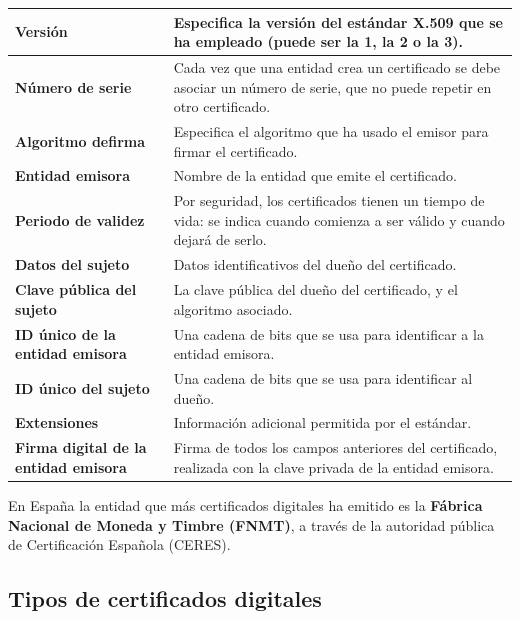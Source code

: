 \documentclass{manual}
\begin{document}
\begin{table}[H]
	\begin{tabular}{|m{3.5cm}||m{10cm}|}
		\hline
		\textbf{Versión} &  Especifica la versión del estándar X.509 que se ha empleado (puede ser la 1, la 2 o la 3).\\ \hline
		\textbf{Número de serie}        & Cada vez que una entidad crea un certificado se debe asociar un número de serie, que no puede repetir en otro certificado. \\ \hline
		\textbf{Algoritmo de\newline firma} &  Especifica el algoritmo que ha usado el emisor para firmar el certificado.\\ \hline
		\textbf{Entidad emisora} & Nombre de la entidad que emite el certificado. \\ \hline
		\textbf{Periodo de validez} &  Por seguridad, los certificados tienen un tiempo de vida: se indica cuando comienza a ser válido y cuando dejará de serlo.  \\ \hline
		\textbf{Datos del sujeto} &  Datos identificativos del dueño del certificado.\\ \hline
		\textbf{Clave pública del sujeto} & La clave pública del dueño del certificado, y el algoritmo asociado. \\ \hline
		\textbf{ID único de la \newline entidad emisora} & Una cadena de bits que se usa para identificar a la entidad emisora.  \\ \hline
		\textbf{ID único del \newline sujeto} & Una cadena de bits que se usa para identificar al dueño. \\ \hline
		\textbf{Extensiones} &  Información adicional permitida por el estándar.\\ \hline
		\textbf{Firma digital de la entidad emisora}   & Firma de todos los campos anteriores del certificado, realizada con la clave privada de la entidad emisora.
  \\ \hline
	\end{tabular}
\end{table}


En España la entidad que más certificados digitales ha emitido es la \textbf{Fábrica Nacional de Moneda y Timbre (FNMT)}, a través de la autoridad pública de Certificación Española (CERES). 



\subsection{Tipos de certificados digitales}
\end{document}
